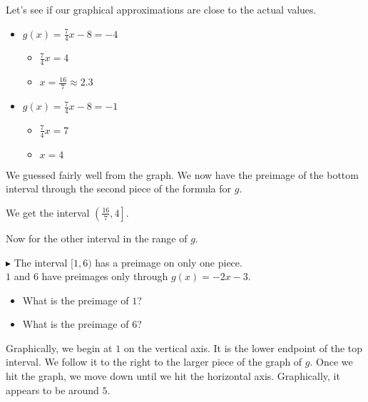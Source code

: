 \documentclass{ximera}
\begin{document}
Let's see if our graphical approximations are close to the actual values.


\begin{itemize}
\item $g(x) = \frac{7}{4}x -8 = -4$
\begin{itemize}
\item $\frac{7}{4}x = 4$
\item $x = \frac{16}{7} \approx 2.3$
\end{itemize}
\end{itemize}




\begin{itemize}
\item $g(x) = \frac{7}{4}x -8 = -1$
\begin{itemize}
\item $\frac{7}{4}x = 7$
\item $x = 4$
\end{itemize}
\end{itemize}








We guessed fairly well from the graph.  We now have the preimage of the bottom interval through the second piece of the formula for $g$.  


We get the interval $\left( \frac{16}{7}, 4 \right]$.





Now for the other interval in the range of $g$.




$\blacktriangleright$ The interval $[1, 6)$ has a preimage on only one piece. \\
$1$ and $6$ have preimages only through $g(x) = -2x-3$.





\begin{itemize}
\item What is the preimage of $1$? 
\item What is the preimage of $6$? 
\end{itemize}



Graphically, we begin at $1$ on the vertical axis.  It is the lower endpoint of the top interval.  We follow it to the right to the larger piece of the graph of $g$.  Once we hit the graph, we move down until we hit the horizontal axis.  Graphically, it appears to be around $5$.
\end{document}
